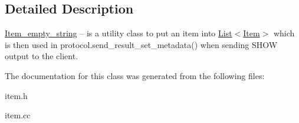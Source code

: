 \subsection{Detailed Description}
\mbox{\hyperlink{classItem__empty__string}{Item\+\_\+empty\+\_\+string}} -- is a utility class to put an item into \mbox{\hyperlink{classList}{List$<$\+Item$>$}} which is then used in protocol.\+send\+\_\+result\+\_\+set\+\_\+metadata() when sending S\+H\+OW output to the client. 

The documentation for this class was generated from the following files\+:\begin{DoxyCompactItemize}
\item 
item.\+h\item 
item.\+cc\end{DoxyCompactItemize}
